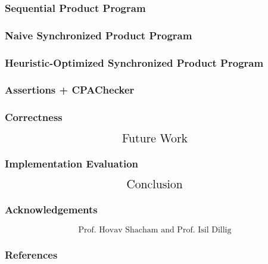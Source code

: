 \documentclass{beamer} %
\theoremstyle{definition} %
\begin{document}
\begin{frame}
\frametitle{Sequential Product Program}
	
\end{frame}

\begin{frame}
\frametitle{Naive Synchronized Product Program}
	
\end{frame}

\begin{frame}
\frametitle{Heuristic-Optimized Synchronized Product Program}
	
\end{frame}

\begin{frame}
\frametitle{Assertions + CPAChecker}
	
\end{frame}

\begin{frame}
\frametitle{Correctness}
	
\end{frame}

\begin{frame}
	\[\text{\Large{Future Work}}\]
\end{frame}

\begin{frame}
\frametitle{Implementation Evaluation}
	
\end{frame}

\begin{frame}
	\[\text{\Large{Conclusion}}\]
\end{frame}

\begin{frame}
\frametitle{Acknowledgements}
	\[\text{Prof. Hovav Shacham and Prof. Isil Dillig}\]
\end{frame}

\begin{frame}
\frametitle{References}
	
\end{frame}
\end{document}
